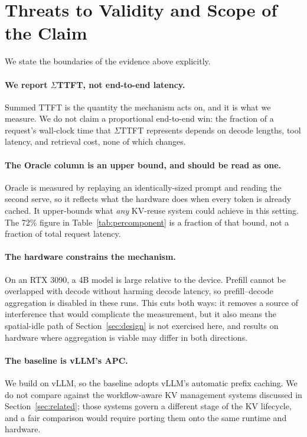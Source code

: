 \section{Threats to Validity and Scope of the Claim}
\label{sec:threats}

We state the boundaries of the evidence above explicitly.

\paragraph{We report \(\Sigma\)TTFT, not end-to-end latency.} Summed TTFT is the
quantity the mechanism acts on, and it is what we measure. We do not claim a
proportional end-to-end win: the fraction of a request's wall-clock time that
\(\Sigma\)TTFT represents depends on decode lengths, tool latency, and retrieval
cost, none of which \sysname{} changes.

\paragraph{The Oracle column is an upper bound, and should be read as one.} Oracle
is measured by replaying an identically-sized prompt and reading the second serve,
so it reflects what the hardware does when every token is already cached. It
upper-bounds what \emph{any} KV-reuse system could achieve in this setting. The
72\% figure in Table~\ref{tab:percomponent} is a fraction of that bound, not a
fraction of total request latency.

\paragraph{The hardware constrains the mechanism.} On an RTX 3090, a 4B model is
large relative to the device. Prefill cannot be overlapped with decode without
harming decode latency, so prefill--decode aggregation is disabled in these runs.
This cuts both ways: it removes a source of interference that would complicate the
measurement, but it also means the spatial-idle path of Section~\ref{sec:design}
is not exercised here, and results on hardware where aggregation is viable may
differ in both directions.

\paragraph{The baseline is vLLM's APC.} We build on vLLM, so the baseline adopts
vLLM's automatic prefix caching. We do not compare against the workflow-aware KV
management systems discussed in Section~\ref{sec:related}; those systems govern a
different stage of the KV lifecycle, and a fair comparison would require porting
them onto the same runtime and hardware.

